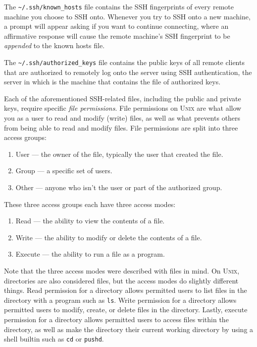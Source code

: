The \texttt{\textasciitilde/.ssh/known\_hosts} file contains the SSH
fingerprints of every remote machine you choose to SSH onto. Whenever
you try to SSH onto a new machine, a prompt will appear asking if you
want to continue connecting, where an affirmative response will cause
the remote machine's SSH fingerprint to be \emph{appended} to the known
hosts file.

The \texttt{\textasciitilde/.ssh/authorized\_keys} file contains the
public keys of all remote clients that are authorized to remotely log
onto the server using SSH authentication, the server in which is the
machine that contains the file of authorized keys.

Each of the aforementioned SSH-related files, including the public and
private keys, require specific \emph{file permissions}. File permissions
on \textsc{Unix} are what allow you as a user to read and modify (write)
files, as well as what prevents others from being able to read and
modify files. File permissions are split into three access groups:
\begin{enumerate}
  \item User --- the owner of the file, typically the user that created
    the file.
  \item Group --- a specific set of users.
  \item Other --- anyone who isn't the user or part of the authorized
    group.
\end{enumerate}
These three access groups each have three access modes:
\begin{enumerate}
  \item Read --- the ability to view the contents of a file.
  \item Write --- the ability to modify or delete the contents of a
    file.
  \item Execute --- the ability to run a file as a program.
\end{enumerate}
Note that the three access modes were described with files in mind. On
\textsc{Unix}, directories are also considered files, but the access
modes do slightly different things. Read permission for a directory
allows permitted users to list files in the directory with a program such as
\texttt{ls}. Write permission for a directory allows permitted users to
modify, create, or delete files in the directory. Lastly, execute
permission for a directory allows permitted users to access files within
the directory, as well as make the directory their current working
directory by using a shell builtin such as \texttt{cd} or
\texttt{pushd}.

